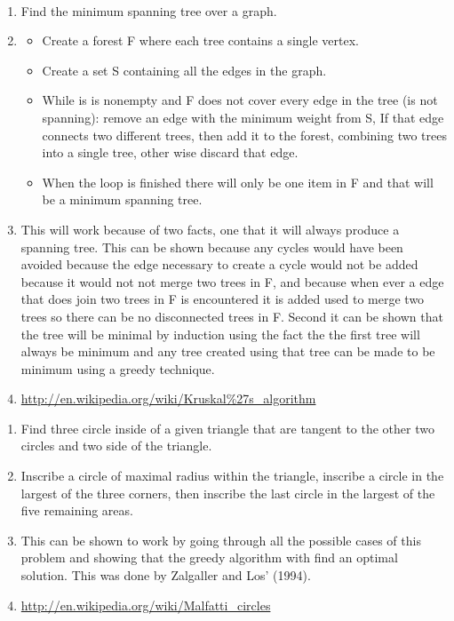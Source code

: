 \documentclass[11pt]{article}
\begin{document}
	\\
	\begin{enumerate}
		\item Find the minimum spanning tree over a graph.
		\item 
		\begin{itemize}
			\item Create a forest F where each tree contains a single vertex.
			\item Create a set S containing all the edges in the graph.
			\item While is is nonempty and F does not cover every edge in the tree (is not spanning): remove an edge with the minimum weight from S, If that edge connects two different trees, then add it to the forest, combining two trees into a single tree, other wise discard that edge.
			\item When the loop is finished there will only be one item in F and that will be a minimum spanning tree.
		\end{itemize}
		\item This will work because of two facts, one that it will always produce a spanning tree. This can be shown because any cycles would have been avoided because the edge necessary to create a cycle would not be added because it would not not merge two trees in F, and because when ever a edge that does join two trees in F is encountered it is added used to merge two trees so there can be no disconnected trees in F. Second it can be shown that the tree will be minimal by induction using the fact the the first tree will always be minimum and any tree created using that tree can be made to be minimum using a greedy technique.
		\item \url{http://en.wikipedia.org/wiki/Kruskal%27s_algorithm}
	\end{enumerate}		
	\begin{enumerate}
		\item Find three circle inside of a given triangle that are tangent to the other two circles and two side of the triangle.
		\item Inscribe a circle of maximal radius within the triangle, inscribe a circle in the largest of the three corners, then inscribe the last circle in the largest of the five remaining areas.
		\item This can be shown to work by going through all the possible cases of this problem and showing that the greedy algorithm with find an optimal solution. This was done by Zalgaller and Los' (1994).
		\item \url{http://en.wikipedia.org/wiki/Malfatti_circles}
	\end{enumerate}
	
\end{document}
